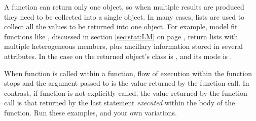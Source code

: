\documentclass[krantz2]{krantz}\usepackage{knitr}
\begin{document}
A function can return only one object, so when multiple results are produced they need to be collected into a single object. In many cases, lists are used to collect all the values to be returned into one \Rlang object. For example, model fit functions like , discussed in section \ref{sec:stat:LM} on page \pageref{sec:stat:LM}, return lists with multiple heterogeneous members, plus ancillary information stored in several attributes. In the case on  the returned object's class is , and its mode is .

\begin{playground}
When function  is called within a function, flow of execution within the function stops and the argument passed to  is the value returned by the function call. In contrast, if function  is not explicitly called, the value returned by the function call is that returned by the last statement \emph{executed} within the body of the function. Run these examples, and your own variations.

\label{chunck:print:funs}
\begin{knitrout}\footnotesize
{}\color{fgcolor}\begin{kframe}
\begin{alltt}
 \hlkwb{<-} \hlstd{(}\hlstd{)} \hlstd{(}\hlstd{)}
\hlstd{(}\hlstd{)}
 \hlkwb{<-} \hlstd{(}\hlstd{)\{}\hlstd{(}\hlstd{)}
\hlstd{(}\hlstd{)}
 \hlkwb{<-} \hlstd{(}\hlstd{)\{}
                   \hlstd{(}\hlstd{)\}}
\hlstd{(}\hlstd{)}
 \hlkwb{<-} \hlstd{(}\hlstd{)\{}\hlstd{()}
                   \hlstd{(}\hlstd{)\}}
\hlstd{(}\hlstd{)}
 \hlkwb{<-} \hlstd{(}\hlstd{)\{}\hlstd{(}
                   \hlstd{(}\hlstd{)\}}
\hlstd{(}\hlstd{)}
\end{alltt}
\end{kframe}
\end{knitrout}
\end{playground}
\end{document}
